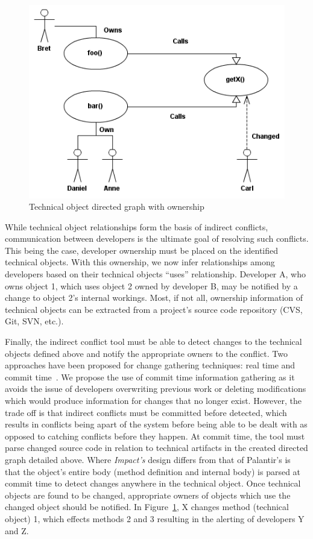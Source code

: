 \documentclass[conference]{IEEEtran}
\begin{document}
\begin{figure}[t!]
\includegraphics[width=\columnwidth]{images/CallGraph}
\caption{Technical object directed graph with ownership\label{fig:graph}}
\end{figure}

While technical object relationships form the basis of indirect conflicts,
communication between developers is the ultimate goal of resolving such conflicts.
This being the case, developer ownership must be placed on the 
identified technical objects. With this ownership, we now infer
relationships among developers based on their technical objects
``uses'' relationship. Developer A, who owns object 1, which uses 
object 2 owned by developer B, may be notified by a change to
object 2's internal workings. Most, if not all, ownership information
of technical objects can be extracted from a project's source code
repository (CVS, Git, SVN, etc.).

Finally, the indirect conflict tool must be able to detect changes
to the technical objects defined above and notify the appropriate owners
to the conflict. 
Two approaches have been 
proposed for change gathering techniques: real time and commit 
time~\cite{Fitzpatrick:2002:SPA}.
We propose the use of commit time
information gathering as it avoids the issue of developers 
overwriting previous work or deleting modifications which would 
produce information for changes that no longer exist. However, the
trade off is that indirect conflicts must be committed before detected,
which results in conflicts being apart of the system before being able
to be dealt with as opposed to catching conflicts before they happen.
At commit time, the tool must parse changed source code in relation
to technical artifacts in the created directed graph detailed above.
Where \textit{Impact's} design differs from that of Palantir's is that
the object's entire body (method definition and internal body) is 
parsed at commit time to detect changes anywhere in the technical object.
Once technical objects are found to be changed, appropriate owners
of objects which use the changed object should be notified.
In Figure~\ref{fig:graph}, X changes method (technical object) 1,
which effects methods 2 and 3 resulting in the alerting of
developers Y and Z.
\end{document}
